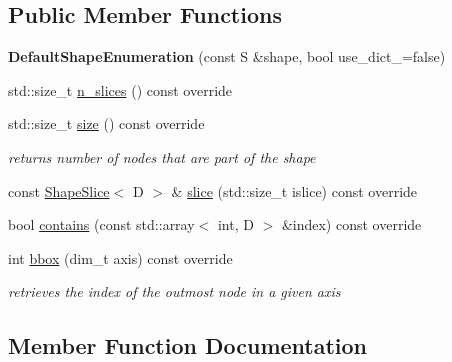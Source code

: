 \subsection*{Public Member Functions}
\begin{DoxyCompactItemize}
\item 
\hypertarget{classwaveblocks_1_1_default_shape_enumeration_ae1e8c2f51bcd7cf13e39f892e95eddc9}{}{\bfseries Default\+Shape\+Enumeration} (const S \&shape, bool use\+\_\+dict\+\_\+=false)\label{classwaveblocks_1_1_default_shape_enumeration_ae1e8c2f51bcd7cf13e39f892e95eddc9}

\item 
std\+::size\+\_\+t \hyperlink{classwaveblocks_1_1_default_shape_enumeration_aab6571cd94ba28768c569626af5a66a3}{n\+\_\+slices} () const override
\item 
std\+::size\+\_\+t \hyperlink{classwaveblocks_1_1_default_shape_enumeration_a5fc46846d7763190f1911b542bfec103}{size} () const override
\begin{DoxyCompactList}\small\item\em returns number of nodes that are part of the shape \end{DoxyCompactList}\item 
const \hyperlink{classwaveblocks_1_1_shape_slice}{Shape\+Slice}$<$ D $>$ \& \hyperlink{classwaveblocks_1_1_default_shape_enumeration_a323986feed57994f2049627e67cda2cc}{slice} (std\+::size\+\_\+t islice) const override
\item 
bool \hyperlink{classwaveblocks_1_1_default_shape_enumeration_a766b764e141186034ed942b25248f31a}{contains} (const std\+::array$<$ int, D $>$ \&index) const override
\item 
int \hyperlink{classwaveblocks_1_1_default_shape_enumeration_a6b6991c193523c2b66870c65c837b9e6}{bbox} (dim\+\_\+t axis) const override
\begin{DoxyCompactList}\small\item\em retrieves the index of the outmost node in a given axis \end{DoxyCompactList}\end{DoxyCompactItemize}


\subsection{Member Function Documentation}
\hypertarget{classwaveblocks_1_1_default_shape_enumeration_a6b6991c193523c2b66870c65c837b9e6}{}

